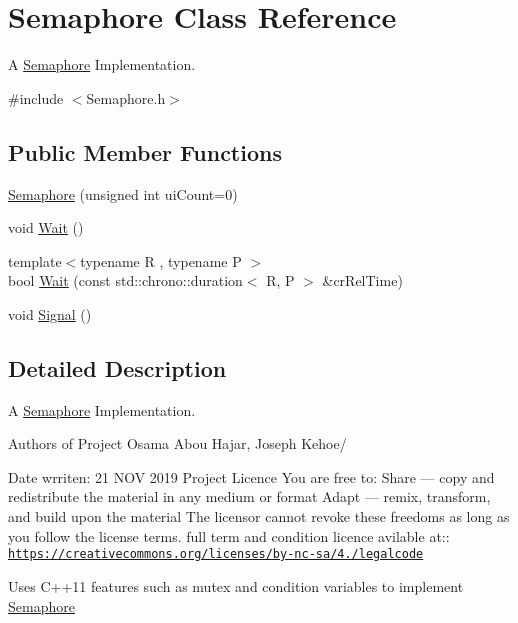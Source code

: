 \hypertarget{class_semaphore}{}\section{Semaphore Class Reference}
\label{class_semaphore}


A \hyperlink{class_semaphore}{Semaphore} Implementation.  




{\ttfamily \#include $<$Semaphore.\+h$>$}

\subsection*{Public Member Functions}
\begin{DoxyCompactItemize}
\item 
\hyperlink{class_semaphore_a0d9290d316636875ca85d1d78950a817}{Semaphore} (unsigned int ui\+Count=0)
\item 
void \hyperlink{class_semaphore_a72aabebf026e3a8b1f3e4d0fa8ee1eda}{Wait} ()
\item 
{\footnotesize template$<$typename R , typename P $>$ }\\bool \hyperlink{class_semaphore_a7f700173ae86ae623684109066e07656}{Wait} (const std\+::chrono\+::duration$<$ R, P $>$ \&cr\+Rel\+Time)
\item 
void \hyperlink{class_semaphore_a86f92f738b4486439b296d8e235895f2}{Signal} ()
\end{DoxyCompactItemize}


\subsection{Detailed Description}
A \hyperlink{class_semaphore}{Semaphore} Implementation. 

Authors of Project Osama Abou Hajar, Joseph Kehoe/

Date wrriten\+: 21 N\+OV 2019 Project Licence You are free to\+: Share — copy and redistribute the material in any medium or format Adapt — remix, transform, and build upon the material The licensor cannot revoke these freedoms as long as you follow the license terms. full term and condition licence avilable at\+:\+: \href{https://creativecommons.org/licenses/by-nc-sa/4.0/legalcode}{\tt https\+://creativecommons.\+org/licenses/by-\/nc-\/sa/4./legalcode}

Uses C++11 features such as mutex and condition variables to implement \hyperlink{class_semaphore}{Semaphore} 

